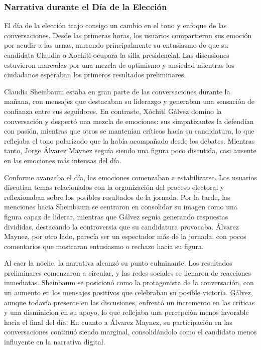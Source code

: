 \documentclass[10pt, a4paper]{article}
\begin{document}
	\subsubsection{Narrativa durante el Día de la Elección}
	
	El día de la elección trajo consigo un cambio en el tono y enfoque de las conversaciones. Desde las primeras horas, los usuarios compartieron sus emoción por acudir a las urnas, narrando principalmente su entusiasmo de que su candidata Claudia o Xochitl ocupara la silla presidencial. Las discusiones estuvieron marcadas por una mezcla de optimismo y ansiedad mientras los ciudadanos esperaban los primeros resultados preliminares.
	
	Claudia Sheinbaum estaba en gran parte de las conversaciones durante la mañana, con mensajes que destacaban su liderazgo y generaban una sensación de confianza entre sus seguidores. En contraste, Xóchitl Gálvez domino la conversación y despertó una mezcla de emociones: sus simpatizantes la defendían con pasión, mientras que otros se mantenían críticos hacia su candidatura, lo que reflejaba el tono polarizado que la había acompañado desde los debates. Mientras tanto, Jorge Álvarez Maynez seguía siendo una figura poco discutida, casi ausente en las emociones más intensas del día.
	
	Conforme avanzaba el día, las emociones comenzaban a estabilizarse. Los usuarios discutían temas relacionados con la organización del proceso electoral y reflexionaban sobre los posibles resultados de la jornada. Por la tarde, las menciones hacia Sheinbaum se centraron en consolidar su imagen como una figura capaz de liderar, mientras que Gálvez seguía generando respuestas divididas, destacando la controversia que su candidatura provocaba. Álvarez Maynez, por otro lado, parecía ser un espectador más de la jornada, con pocos comentarios que mostraran entusiasmo o rechazo hacia su figura.
	
	Al caer la noche, la narrativa alcanzó su punto culminante. Los resultados preliminares comenzaron a circular, y las redes sociales se llenaron de reacciones inmediatas. Sheinbaum se posicionó como la protagonista de la conversación, con un aumento en los mensajes positivos que celebraban su posible victoria. Gálvez, aunque todavía presente en las discusiones, enfrentó un incremento en las críticas y una disminicion en su apoyo, lo que reflejaba una percepción menos favorable hacia el final del día. En cuanto a Álvarez Maynez, su participación en las conversaciones continuó siendo marginal, consolidándolo como el candidato menos influyente en la narrativa digital.
	
\end{document}
